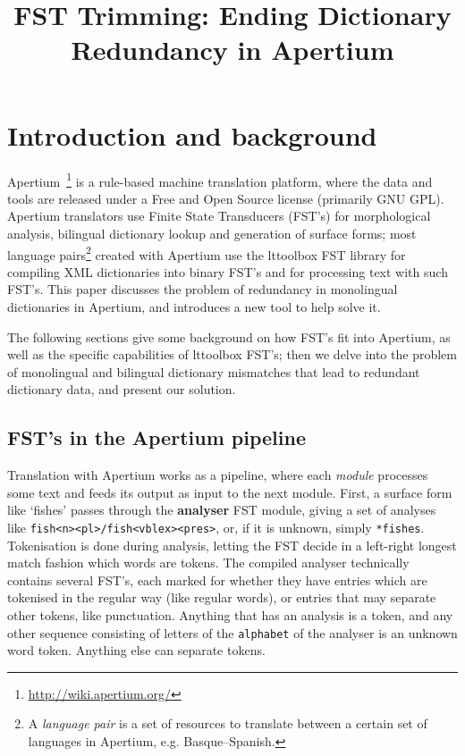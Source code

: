 \documentclass[10pt, a4paper]{article}
\title{FST Trimming: Ending Dictionary Redundancy in Apertium} %
\newcommand{\ana}[1]{\texttt{#1}}
\newcommand{\f}[1]{`#1'}
\begin{document}
\maketitleabstract

\section{Introduction and background}

Apertium~\cite{forcada2011afp}\footnote{\url{http://wiki.apertium.org/}}
is a rule-based machine translation platform, where the data and tools
are released under a Free and Open Source license (primarily GNU GPL).
Apertium translators use Finite State Transducers (FST's) for
morphological analysis, bilingual dictionary lookup and generation of
surface forms; most language pairs\footnote{A \emph{language pair} is
  a set of resources to translate between a certain set of languages
  in Apertium, e.g. Basque--Spanish.} created with Apertium use the
lttoolbox FST library for compiling XML dictionaries into binary FST's
and for processing text with such FST's. This paper discusses the
problem of redundancy in monolingual dictionaries in Apertium, and
introduces a new tool to help solve it.

The following sections give some background on how FST's fit into
Apertium, as well as the specific capabilities of lttoolbox
FST's; then we delve into the problem of monolingual and bilingual
dictionary mismatches that lead to redundant dictionary data, and
present our solution.

\subsection{FST's in the Apertium pipeline}
\label{sec:pipeline}

Translation with Apertium works as a pipeline, where each
\emph{module} processes some text and feeds its output as input to the
next module. First, a surface form like \f{fishes} passes through the
\textbf{analyser} FST module, giving a set of analyses like
\ana{fish<n><pl>/fish<vblex><pres>}, or, if it is unknown, simply
\ana{*fishes}. Tokenisation is done during analysis, letting the FST
decide in a left-right longest match fashion which words are tokens.
The compiled analyser technically contains several FST's, each marked
for whether they have entries which are tokenised in the regular
way (like regular words), or entries that may separate other tokens,
like punctuation. Anything that has an analysis is a token, and any
other sequence consisting of letters of the \texttt{alphabet} of the
analyser is an unknown word token. Anything else can separate tokens.
\end{document}

